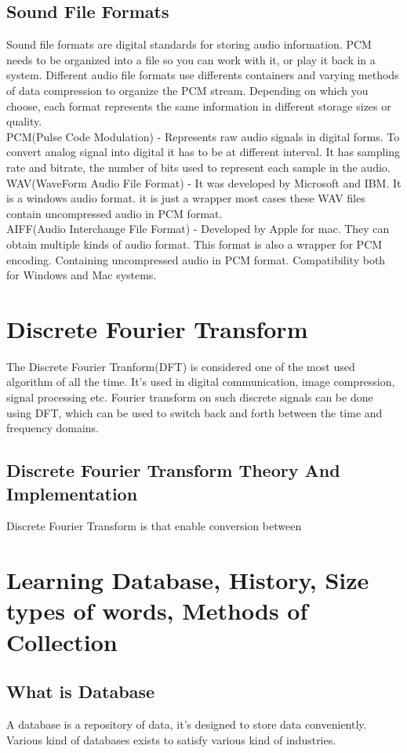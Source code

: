 \documentclass[english,12pt,oneside,a4paper]{article}
\begin{document}
\begin{center}
		\subsection{Sound File Formats}
		Sound file formats are digital standards for storing audio information. PCM needs to be organized into a file so you can work with it, or play it back in a system. Different audio file formats use differents containers and varying methods of data compression to organize the PCM stream. Depending on which you choose, each format represents the same information in different storage sizes or quality.\\
		PCM(Pulse Code Modulation) - Represents raw audio signals in digital forms. To convert analog signal into digital it has to be at different interval. It has sampling rate and bitrate, the number of bits used to represent each sample in the audio.\\
		WAV(WaveForm Audio File Format) - It was developed by Microsoft and IBM. It is a windows audio format. it is just a wrapper most cases these WAV files contain uncompressed audio in PCM format.\\
		AIFF(Audio Interchange File Format) - Developed by Apple for mac.
		They can obtain multiple kinds of audio format. This format is also a wrapper for PCM encoding. Containing uncompressed audio in PCM format. Compatibility both for Windows and Mac systems.
		
		\section{Discrete Fourier Transform}
		The Discrete Fourier Tranform(DFT) is considered one of the most used algorithm of all the time. It's used in digital communication, image compression, signal processing etc. Fourier transform on such discrete signals can be done using DFT, which can be used to switch back and forth between the time and frequency domains.
		\subsection{Discrete Fourier Transform Theory And Implementation}
		Discrete Fourier Transform is   that enable conversion between
		\section{Learning Database, History, Size types of words, Methods of Collection}
		\subsection{What is Database}
		A database is a repository of data, it's designed to store data conveniently. Various kind of databases exists to satisfy various kind of industries. 

\end{center}
\end{document}
